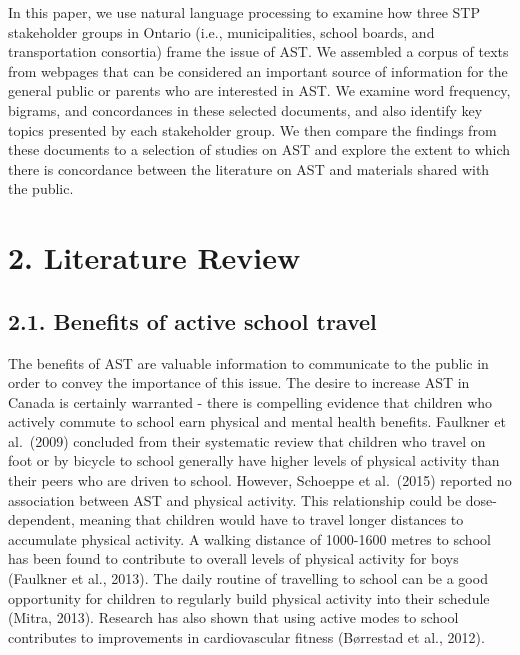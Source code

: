 \documentclass[]{elsarticle} %
\begin{document}
In this paper, we use natural language processing to examine how three
STP stakeholder groups in Ontario (i.e., municipalities, school boards,
and transportation consortia) frame the issue of AST. We assembled a
corpus of texts from webpages that can be considered an important source
of information for the general public or parents who are interested in
AST. We examine word frequency, bigrams, and concordances in these
selected documents, and also identify key topics presented by each
stakeholder group. We then compare the findings from these documents to
a selection of studies on AST and explore the extent to which there is
concordance between the literature on AST and materials shared with the
public.

\hypertarget{literature-review}{%
\section{2. Literature Review}\label{literature-review}}

\hypertarget{benefits-of-active-school-travel}{%
\subsection{2.1. Benefits of active school
travel}\label{benefits-of-active-school-travel}}

The benefits of AST are valuable information to communicate to the
public in order to convey the importance of this issue. The desire to
increase AST in Canada is certainly warranted - there is compelling
evidence that children who actively commute to school earn physical and
mental health benefits. Faulkner et al.~(2009) concluded from their
systematic review that children who travel on foot or by bicycle to
school generally have higher levels of physical activity than their
peers who are driven to school. However, Schoeppe et al.~(2015) reported
no association between AST and physical activity. This relationship
could be dose-dependent, meaning that children would have to travel
longer distances to accumulate physical activity. A walking distance of
1000-1600 metres to school has been found to contribute to overall
levels of physical activity for boys (Faulkner et al., 2013). The daily
routine of travelling to school can be a good opportunity for children
to regularly build physical activity into their schedule (Mitra, 2013).
Research has also shown that using active modes to school contributes to
improvements in cardiovascular fitness (Børrestad et al., 2012).
\end{document}
